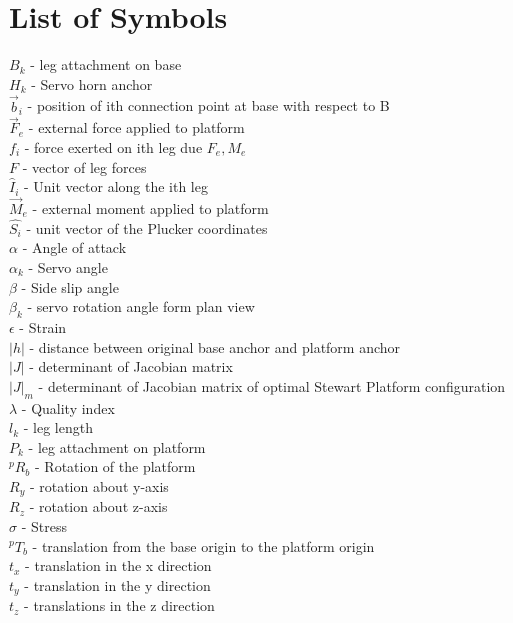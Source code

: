 \section*{List of Symbols}
    $B_{k}$ - leg attachment on base\\
    $H_{k}$ - Servo horn anchor\\
    $\vec{b}_i$ - position of ith connection point at base with respect to B\\
    $\vec{F}_e$ - external force applied to platform\\
    $f_i$ - force exerted on ith leg due $F_e, M_e$\\
    $F$ - vector of leg forces\\
    $\hat{I}_i$ - Unit vector along the ith leg\\
    $\vec{M}_e$ - external moment applied to platform\\
    $\hat{{S_{i}}}$ - unit vector of the Plucker coordinates\\
    $\alpha$ - Angle of attack\\
    $\alpha_{k}$ - Servo angle\\
    $\beta$ - Side slip angle\\
    $\beta_{k}$ - servo rotation angle form plan view\\
    $\epsilon$ - Strain\\
    $|h|$ - distance between original base anchor and platform anchor\\
    $|J|$ - determinant of Jacobian matrix\\
    $|J|_{m}$ - determinant of Jacobian matrix of optimal Stewart Platform configuration\\
    $\lambda$ - Quality index\\
    $l_{k}$ - leg length\\
    $P_{k}$ - leg attachment on platform\\
    $^{p}R_{b}$ - Rotation of the platform\\
    $R_{y}$ - rotation about y-axis\\
    $R_{z}$ - rotation about z-axis\\
    $\sigma$ - Stress\\
    $^{p}T_{b}$ - translation from the base origin to the platform origin\\
    $t_{x}$ -  translation in the x direction\\
    $t_{y}$ -  translation in the y direction\\
    $t_{z} $ -  translations in the z direction\\
\pagebreak